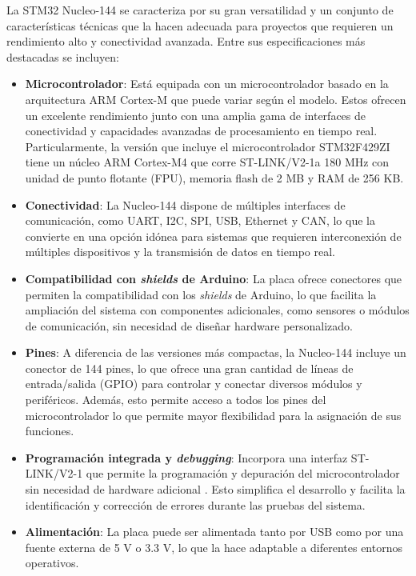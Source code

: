 La STM32 Nucleo-144 se caracteriza por su gran versatilidad y un conjunto de características técnicas que la hacen adecuada para proyectos que requieren un rendimiento alto y conectividad avanzada. Entre sus especificaciones más destacadas se incluyen:

\begin{itemize}
    \item \textbf{Microcontrolador}: Está equipada con un microcontrolador basado en la arquitectura ARM Cortex-M que puede variar según el modelo. Estos ofrecen un excelente rendimiento junto con una amplia gama de interfaces de conectividad y capacidades avanzadas de procesamiento en tiempo real. Particularmente, la versión que incluye el microcontrolador STM32F429ZI \cite{stm32f429zi} tiene un núcleo ARM Cortex-M4 que corre ST-LINK/V2-1a 180 MHz con unidad de punto flotante (FPU), memoria flash de 2 MB y RAM de 256 KB. 
    \item \textbf{Conectividad}: La Nucleo-144 dispone de múltiples interfaces de comunicación, como UART, I2C, SPI, USB, Ethernet y CAN, lo que la convierte en una opción idónea para sistemas que requieren interconexión de múltiples dispositivos y la transmisión de datos en tiempo real.
    \item \textbf{Compatibilidad con \textit{shields} de Arduino}: La placa ofrece conectores que permiten la compatibilidad con los \textit{shields} de Arduino, lo que facilita la ampliación del sistema con componentes adicionales, como sensores o módulos de comunicación, sin necesidad de diseñar hardware personalizado.
    \item \textbf{Pines}: A diferencia de las versiones más compactas, la Nucleo-144 incluye un conector de 144 pines, lo que ofrece una gran cantidad de líneas de entrada/salida (GPIO) para controlar y conectar diversos módulos y periféricos. Además, esto permite acceso a todos los pines del microcontrolador lo que permite mayor flexibilidad para la asignación de sus funciones.
    \item \textbf{Programación integrada y \textit{debugging}}: Incorpora una interfaz ST-LINK/V2-1 que permite la programación y depuración del microcontrolador sin necesidad de hardware adicional \cite{st_link}. Esto simplifica el desarrollo y facilita la identificación y corrección de errores durante las pruebas del sistema.
    \item \textbf{Alimentación}: La placa puede ser alimentada tanto por USB como por una fuente externa de 5 V o 3.3 V, lo que la hace adaptable a diferentes entornos operativos.
\end{itemize}

